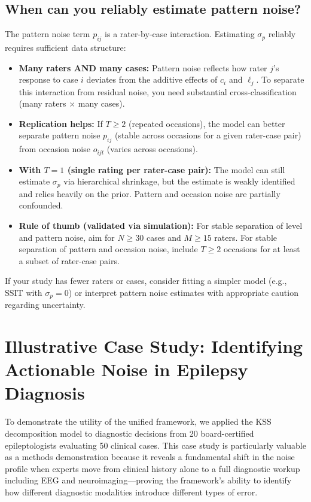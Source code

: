 \documentclass[num-refs]{wiley-article}
\begin{document}
\subsection*{When can you reliably estimate pattern noise?}

The pattern noise term $p_{ij}$ is a rater-by-case interaction. Estimating $\sigma_p$ reliably requires sufficient data structure:

\begin{itemize}
    \item \textbf{Many raters AND many cases:} Pattern noise reflects how rater $j$'s response to case $i$ deviates from the additive effects of $c_i$ and $\ell_j$. To separate this interaction from residual noise, you need substantial cross-classification (many raters $\times$ many cases).

    \item \textbf{Replication helps:} If $T \geq 2$ (repeated occasions), the model can better separate pattern noise $p_{ij}$ (stable across occasions for a given rater-case pair) from occasion noise $o_{ijt}$ (varies across occasions).

    \item \textbf{With $T=1$ (single rating per rater-case pair):} The model can still estimate $\sigma_p$ via hierarchical shrinkage, but the estimate is weakly identified and relies heavily on the prior. Pattern and occasion noise are partially confounded.

    \item \textbf{Rule of thumb (validated via simulation):} For stable separation of level and pattern noise, aim for $N \geq 30$ cases and $M \geq 15$ raters. For stable separation of pattern and occasion noise, include $T \geq 2$ occasions for at least a subset of rater-case pairs.
\end{itemize}

If your study has fewer raters or cases, consider fitting a simpler model (e.g., SSIT with $\sigma_p = 0$) or interpret pattern noise estimates with appropriate caution regarding uncertainty.

\section*{Illustrative Case Study: Identifying Actionable Noise in Epilepsy Diagnosis}\label{section-case-study}

To demonstrate the utility of the unified framework, we applied the KSS decomposition model to diagnostic decisions from 20 board-certified epileptologists evaluating 50 clinical cases. This case study is particularly valuable as a methods demonstration because it reveals a fundamental shift in the noise profile when experts move from clinical history alone to a full diagnostic workup including EEG and neuroimaging---proving the framework's ability to identify how different diagnostic modalities introduce different types of error.
\end{document}

